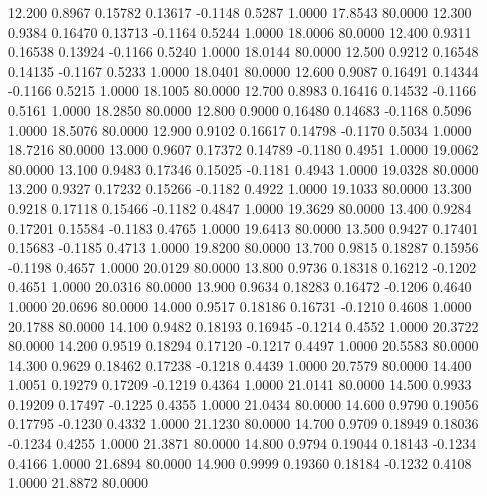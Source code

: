   12.200   0.8967   0.15782   0.13617  -0.1148   0.5287   1.0000  17.8543  80.0000
  12.300   0.9384   0.16470   0.13713  -0.1164   0.5244   1.0000  18.0006  80.0000
  12.400   0.9311   0.16538   0.13924  -0.1166   0.5240   1.0000  18.0144  80.0000
  12.500   0.9212   0.16548   0.14135  -0.1167   0.5233   1.0000  18.0401  80.0000
  12.600   0.9087   0.16491   0.14344  -0.1166   0.5215   1.0000  18.1005  80.0000
  12.700   0.8983   0.16416   0.14532  -0.1166   0.5161   1.0000  18.2850  80.0000
  12.800   0.9000   0.16480   0.14683  -0.1168   0.5096   1.0000  18.5076  80.0000
  12.900   0.9102   0.16617   0.14798  -0.1170   0.5034   1.0000  18.7216  80.0000
  13.000   0.9607   0.17372   0.14789  -0.1180   0.4951   1.0000  19.0062  80.0000
  13.100   0.9483   0.17346   0.15025  -0.1181   0.4943   1.0000  19.0328  80.0000
  13.200   0.9327   0.17232   0.15266  -0.1182   0.4922   1.0000  19.1033  80.0000
  13.300   0.9218   0.17118   0.15466  -0.1182   0.4847   1.0000  19.3629  80.0000
  13.400   0.9284   0.17201   0.15584  -0.1183   0.4765   1.0000  19.6413  80.0000
  13.500   0.9427   0.17401   0.15683  -0.1185   0.4713   1.0000  19.8200  80.0000
  13.700   0.9815   0.18287   0.15956  -0.1198   0.4657   1.0000  20.0129  80.0000
  13.800   0.9736   0.18318   0.16212  -0.1202   0.4651   1.0000  20.0316  80.0000
  13.900   0.9634   0.18283   0.16472  -0.1206   0.4640   1.0000  20.0696  80.0000
  14.000   0.9517   0.18186   0.16731  -0.1210   0.4608   1.0000  20.1788  80.0000
  14.100   0.9482   0.18193   0.16945  -0.1214   0.4552   1.0000  20.3722  80.0000
  14.200   0.9519   0.18294   0.17120  -0.1217   0.4497   1.0000  20.5583  80.0000
  14.300   0.9629   0.18462   0.17238  -0.1218   0.4439   1.0000  20.7579  80.0000
  14.400   1.0051   0.19279   0.17209  -0.1219   0.4364   1.0000  21.0141  80.0000
  14.500   0.9933   0.19209   0.17497  -0.1225   0.4355   1.0000  21.0434  80.0000
  14.600   0.9790   0.19056   0.17795  -0.1230   0.4332   1.0000  21.1230  80.0000
  14.700   0.9709   0.18949   0.18036  -0.1234   0.4255   1.0000  21.3871  80.0000
  14.800   0.9794   0.19044   0.18143  -0.1234   0.4166   1.0000  21.6894  80.0000
  14.900   0.9999   0.19360   0.18184  -0.1232   0.4108   1.0000  21.8872  80.0000
